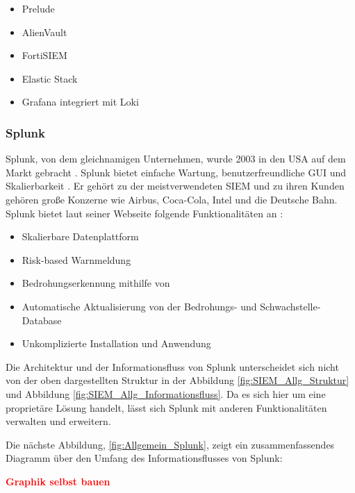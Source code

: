 \begin{itemize}[noitemsep]
   \item Prelude %
   \item AlienVault  %
   \item FortiSIEM %
   \item Elastic Stack %
   \item Grafana integriert mit Loki %
\end{itemize}

\subsubsection{Splunk}
Splunk, von dem gleichnamigen Unternehmen, wurde 2003 in den USA auf dem Markt gebracht \citep{Splunk_splunk}. Splunk bietet einfache Wartung, benutzerfreundliche \gls{GUI} und Skalierbarkeit \citep{Kazarov_Splunk}. Er gehört zu der meistverwendeten \gls{SIEM} und zu ihren Kunden gehören große Konzerne wie Airbus, Coca-Cola, Intel und die Deutsche Bahn. Splunk bietet laut seiner Webseite folgende Funktionalitäten an \citep{Splunk_SPE}:

\begin{itemize}[noitemsep]
   \item Skalierbare Datenplattform 
   \item Risk-based Warnmeldung
   \item Bedrohungserkennung mithilfe von  
   \item Automatische Aktualisierung von der Bedrohungs- und Schwachstelle-Database 
   \item Unkomplizierte Installation und Anwendung 
\end{itemize}

Die Architektur und der Informationsfluss von Splunk unterscheidet sich nicht von der oben dargestellten Struktur in der Abbildung \ref{fig:SIEM_Allg_Struktur} und Abbildung \ref{fig:SIEM_Allg_Informationsfluss}. Da es sich hier um eine proprietäre Lösung handelt, lässt sich Splunk mit anderen Funktionalitäten verwalten und erweitern. 

Die nächste Abbildung, \ref{fig:Allgemein_Splunk}, zeigt ein zusammenfassendes Diagramm über den Umfang des Informationsflusses von Splunk:

\textbf{\textcolor{red}{Graphik selbst bauen}}

